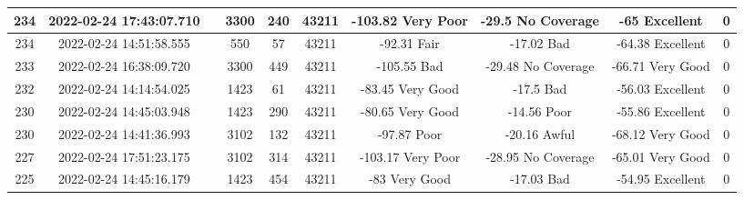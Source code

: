 \begin{longtable*}{|c|c|c|c|c|c|c|c|c|c|}
234&2022-02-24 17:43:07.710&&3300&240&43211& -103.82   Very Poor   & -29.5     No Coverage & -65       Excellent   & 0\\\hline
{}234&2022-02-24 14:51:58.555&&550&57&43211& -92.31    Fair        & -17.02    Bad         & -64.38    Excellent   & 0\\\hline
{}233&2022-02-24 16:38:09.720&&3300&449&43211& -105.55   Bad         & -29.48    No Coverage & -66.71    Very Good   & 0\\\hline
{}232&2022-02-24 14:14:54.025&&1423&61&43211& -83.45    Very Good   & -17.5     Bad         & -56.03    Excellent   & 0\\\hline
{}230&2022-02-24 14:45:03.948&&1423&290&43211& -80.65    Very Good   & -14.56    Poor        & -55.86    Excellent   & 0\\\hline
{}230&2022-02-24 14:41:36.993&&3102&132&43211& -97.87    Poor        & -20.16    Awful       & -68.12    Very Good   & 0\\\hline
{}227&2022-02-24 17:51:23.175&&3102&314&43211& -103.17   Very Poor   & -28.95    No Coverage & -65.01    Very Good   & 0\\\hline
{}225&2022-02-24 14:45:16.179&&1423&454&43211& -83       Very Good   & -17.03    Bad         & -54.95    Excellent   & 0\\\hline

\end{longtable*}

